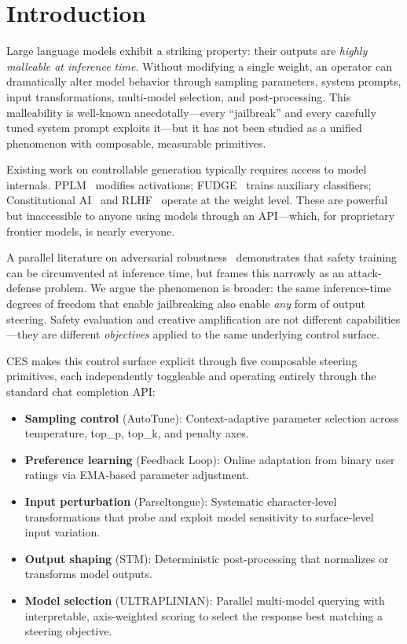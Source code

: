 \documentclass[11pt]{article}
\begin{document}
\section{Introduction}

Large language models exhibit a striking property: their outputs are \emph{highly malleable at inference time}. Without modifying a single weight, an operator can dramatically alter model behavior through sampling parameters, system prompts, input transformations, multi-model selection, and post-processing. This malleability is well-known anecdotally---every ``jailbreak'' and every carefully tuned system prompt exploits it---but it has not been studied as a unified phenomenon with composable, measurable primitives.

Existing work on controllable generation typically requires access to model internals. PPLM~\cite{dathathri2020plug} modifies activations; FUDGE~\cite{yang2021fudge} trains auxiliary classifiers; Constitutional AI~\cite{bai2022constitutional} and RLHF~\cite{ouyang2022training} operate at the weight level. These are powerful but inaccessible to anyone using models through an API---which, for proprietary frontier models, is nearly everyone.

A parallel literature on adversarial robustness~\cite{zou2023universal,wei2023jailbroken,chao2023jailbreaking} demonstrates that safety training can be circumvented at inference time, but frames this narrowly as an attack-defense problem. We argue the phenomenon is broader: the same inference-time degrees of freedom that enable jailbreaking also enable \emph{any} form of output steering. Safety evaluation and creative amplification are not different capabilities---they are different \emph{objectives} applied to the same underlying control surface.

\textsc{CES} makes this control surface explicit through five composable steering primitives, each independently toggleable and operating entirely through the standard chat completion API:

\begin{itemize}
    \item \textbf{Sampling control} (AutoTune): Context-adaptive parameter selection across temperature, top\_p, top\_k, and penalty axes.
    \item \textbf{Preference learning} (Feedback Loop): Online adaptation from binary user ratings via EMA-based parameter adjustment.
    \item \textbf{Input perturbation} (Parseltongue): Systematic character-level transformations that probe and exploit model sensitivity to surface-level input variation.
    \item \textbf{Output shaping} (STM): Deterministic post-processing that normalizes or transforms model outputs.
    \item \textbf{Model selection} (ULTRAPLINIAN): Parallel multi-model querying with interpretable, axis-weighted scoring to select the response best matching a steering objective.
\end{itemize}
\end{document}

